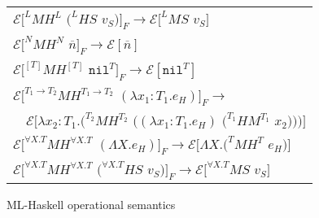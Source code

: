 \begin{figure}[p]
\centering
\begin{tabular}{l}
\vspace{5pt}

$\mathscr{E}[^{L}MH^{L}$ $(^{L}HS$ $v_{S})]_{F}\rightarrow\mathscr{E}[^{L}MS$ $v_{S}]$ \\

\vspace{5pt}

$\mathscr{E}[^{N}MH^{N}$ $\overline{n}]_{F}\rightarrow\mathscr{E}[\overline{n}]$ \\

\vspace{5pt}

$\mathscr{E}[^{[T]}MH^{[T]}$ $\mathtt{nil}^{T}]_{F}\rightarrow\mathscr{E}[\mathtt{nil}^{T}]$ \\

\vspace{5pt}

$\mathscr{E}[^{T_{1}\rightarrow T_{2}}MH^{T_{1}\rightarrow T_{2}}$ $(\lambda x_{1}:T_{1}.e_{H})]_{F}\rightarrow$ \\

\vspace{5pt}

$\quad\mathscr{E}[\lambda x_{2}:T_{1}.(^{T_{2}}MH^{T_{2}}$ $((\lambda x_{1}:T_{1}.e_{H})$ $(^{T_{1}}HM^{T_{1}}$ $x_{2})))]$ \\

\vspace{5pt}

$\mathscr{E}[^{\forall X.T}MH^{\forall X.T}$ $(\Lambda X.e_{H})]_{F}\rightarrow\mathscr{E}[\Lambda X.(^{T}MH^{T}$ $e_{H})]$ \\

\vspace{5pt}

$\mathscr{E}[^{\forall X.T}MH^{\forall X.T}$ $(^{\forall X.T}HS$ $v_{S})]_{F}\rightarrow\mathscr{E}[^{\forall X.T}MS$ $v_{S}]$ \\
\end{tabular}
\caption{ML-Haskell operational semantics}
\label{mhos}
\end{figure}
